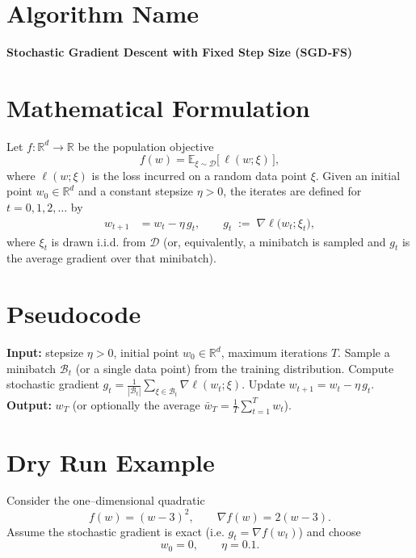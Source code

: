\documentclass[11pt]{article}
\newcommand{\R}{\mathbb{R}}
\begin{document}
\section*{Algorithm Name}
\textbf{Stochastic Gradient Descent with Fixed Step Size (SGD‑FS)}  

\section*{Mathematical Formulation}
Let $f:\R^{d}\rightarrow\R$ be the population objective
\[
f(w)=\mathbb{E}_{\xi\sim\mathcal{D}}\!\big[\,\ell(w;\xi)\,\big],
\]
where $\ell(w;\xi)$ is the loss incurred on a random data point $\xi$.  
Given an initial point $w_{0}\in\R^{d}$ and a constant stepsize $\eta>0$, the iterates are defined for $t=0,1,2,\dots$ by
\begin{align}
\label{eq:update}
w_{t+1}&=w_{t}-\eta\,g_{t},\qquad 
g_{t}\;:=\;\nabla\ell\big(w_{t};\xi_{t}\big),
\end{align}
where $\xi_{t}$ is drawn i.i.d. from $\mathcal{D}$ (or, equivalently, a minibatch is sampled and $g_{t}$ is the average gradient over that minibatch).  

\section*{Pseudocode}
\begin{algorithm}[H]
\caption{SGD‑FS}
\begin{algorithmic}[1]
\State \textbf{Input:} stepsize $\eta>0$, initial point $w_{0}\in\R^{d}$, maximum iterations $T$.
    \State Sample a minibatch $\mathcal{B}_{t}$ (or a single data point) from the training distribution.
    \State Compute stochastic gradient $g_{t}= \frac{1}{|\mathcal{B}_{t}|}\sum_{\xi\in\mathcal{B}_{t}}\nabla\ell(w_{t};\xi)$.
    \State Update $w_{t+1}=w_{t}-\eta\,g_{t}$.
\EndFor
\State \textbf{Output:} $w_{T}$ (or optionally the average $\bar w_T=\frac1T\sum_{t=1}^{T}w_t$).
\end{algorithmic}
\end{algorithm}

\section*{Dry Run Example}
Consider the one–dimensional quadratic
\[
f(w)=(w-3)^{2},\qquad \nabla f(w)=2(w-3).
\]
Assume the stochastic gradient is exact (i.e. $g_{t}=\nabla f(w_{t})$) and choose
\[
w_{0}=0,\qquad \eta=0.1.
\]
\end{document}
